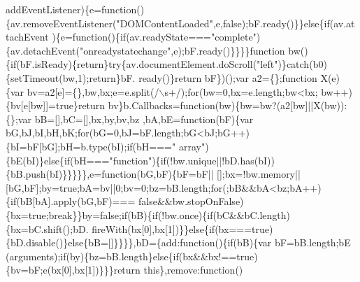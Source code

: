 \begin{DoxyCode}
      addEventListener)\{e=\textcolor{keyword}{function}()\{av.removeEventListener(\textcolor{stringliteral}{"DOMContentLoaded"},e,\textcolor{keyword}{false});bF.ready()\}\}\textcolor{keywordflow}{else}\{\textcolor{keywordflow}{if}(av.attachEvent
      )\{e=\textcolor{keyword}{function}()\{\textcolor{keywordflow}{if}(av.readyState===\textcolor{stringliteral}{"complete"})\{av.detachEvent(\textcolor{stringliteral}{"onreadystatechange"},e);bF.ready()\}\}\}\}\textcolor{keyword}{function} 
      bw()\{\textcolor{keywordflow}{if}(bF.isReady)\{\textcolor{keywordflow}{return}\}\textcolor{keywordflow}{try}\{av.documentElement.doScroll(\textcolor{stringliteral}{"left"})\}\textcolor{keywordflow}{catch}(b0)\{setTimeout(bw,1);\textcolor{keywordflow}{return}\}bF.
      ready()\}\textcolor{keywordflow}{return} bF\})();var a2=\{\};\textcolor{keyword}{function} X(e)\{var bv=a2[e]=\{\},bw,bx;e=e.split(/\(\backslash\)s+/);\textcolor{keywordflow}{for}(bw=0,bx=e.length;bw<bx;
      bw++)\{bv[e[bw]]=\textcolor{keyword}{true}\}\textcolor{keywordflow}{return} bv\}b.Callbacks=\textcolor{keyword}{function}(bw)\{bw=bw?(a2[bw]||X(bw)):\{\};var bB=[],bC=[],bx,by,bv,bz
      ,bA,bE=\textcolor{keyword}{function}(bF)\{var bG,bJ,bI,bH,bK;\textcolor{keywordflow}{for}(bG=0,bJ=bF.length;bG<bJ;bG++)\{bI=bF[bG];bH=b.type(bI);\textcolor{keywordflow}{if}(bH===\textcolor{stringliteral}{"
      array"})\{bE(bI)\}\textcolor{keywordflow}{else}\{\textcolor{keywordflow}{if}(bH===\textcolor{stringliteral}{"function"})\{\textcolor{keywordflow}{if}(!bw.unique||!bD.has(bI))\{bB.push(bI)\}\}\}\}\},e=\textcolor{keyword}{function}(bG,bF)\{bF=bF||
      [];bx=!bw.memory||[bG,bF];by=\textcolor{keyword}{true};bA=bv||0;bv=0;bz=bB.length;\textcolor{keywordflow}{for}(;bB&&bA<bz;bA++)\{\textcolor{keywordflow}{if}(bB[bA].apply(bG,bF)===\textcolor{keyword}{
      false}&&bw.stopOnFalse)\{bx=\textcolor{keyword}{true};\textcolor{keywordflow}{break}\}\}by=\textcolor{keyword}{false};\textcolor{keywordflow}{if}(bB)\{\textcolor{keywordflow}{if}(!bw.once)\{\textcolor{keywordflow}{if}(bC&&bC.length)\{bx=bC.shift();bD.
      fireWith(bx[0],bx[1])\}\}\textcolor{keywordflow}{else}\{\textcolor{keywordflow}{if}(bx===\textcolor{keyword}{true})\{bD.disable()\}\textcolor{keywordflow}{else}\{bB=[]\}\}\}\},bD=\{add:\textcolor{keyword}{function}()\{\textcolor{keywordflow}{if}(bB)\{var bF=bB.length;bE
      (arguments);\textcolor{keywordflow}{if}(by)\{bz=bB.length\}\textcolor{keywordflow}{else}\{\textcolor{keywordflow}{if}(bx&&bx!==\textcolor{keyword}{true})\{bv=bF;e(bx[0],bx[1])\}\}\}\textcolor{keywordflow}{return} \textcolor{keyword}{this}\},\textcolor{keyword}{remove}:\textcolor{keyword}{function}()

\end{DoxyCode}
